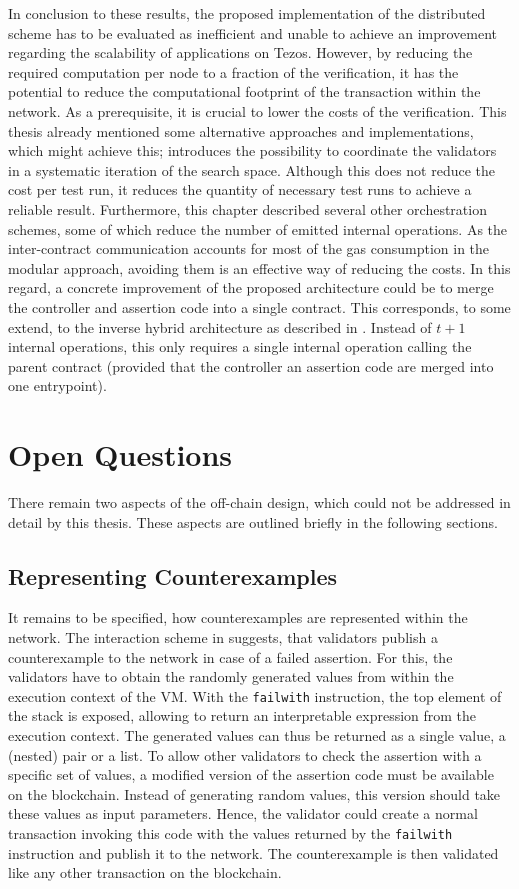 In conclusion to these results, the proposed implementation of the distributed scheme has to be evaluated as inefficient and unable to achieve an improvement regarding the scalability of applications on Tezos. However, by reducing the required computation per node to a fraction of the verification, it has the potential to reduce the computational footprint of the transaction within the network. As a prerequisite, it is crucial to lower the costs of the verification. This thesis already mentioned some alternative approaches and implementations, which might achieve this;  introduces the possibility to coordinate the validators in a systematic iteration of the search space. Although this does not reduce the cost per test run, it reduces the quantity of necessary test runs to achieve a reliable result. Furthermore, this chapter described several other orchestration schemes, some of which reduce the number of emitted internal operations. As the inter-contract communication accounts for most of the gas consumption in the modular approach, avoiding them is an effective way of reducing the costs. In this regard, a concrete improvement of the proposed architecture could be to merge the controller and assertion code into a single contract. This corresponds, to some extend, to the inverse hybrid architecture as described in . Instead of $t+1$ internal operations, this only requires a single internal operation calling the parent contract (provided that the controller an assertion code are merged into one entrypoint).

\section{Open Questions}
There remain two aspects of the off-chain design, which could not be addressed in detail by this thesis. These aspects are outlined briefly in the following sections.

\subsection{Representing Counterexamples}\label{sec:counterexample}
It remains to be specified, how counterexamples are represented within the network. The interaction scheme in  suggests, that validators publish a counterexample to the network in case of a failed assertion. For this, the validators have to obtain the randomly generated values from within the execution context of the VM. With the \texttt{failwith} instruction, the top element of the stack is exposed, allowing to return an interpretable expression from the execution context. The generated values can thus be returned as a single value, a (nested) pair or a list. To allow other validators to check the assertion with a specific set of values, a modified version of the assertion code must be available on the blockchain. Instead of generating random values, this version should take these values as input parameters. Hence, the validator could create a normal transaction invoking this code with the values returned by the \texttt{failwith} instruction and publish it to the network. The counterexample is then validated like any other transaction on the blockchain. 

